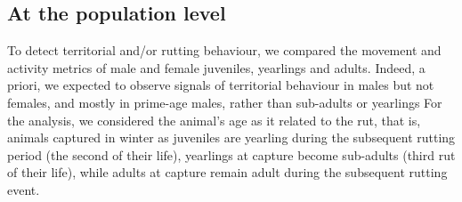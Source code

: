 \documentclass[a4paper,11pt]{article}
\begin{document}
\subsection*{At the population level}
To detect territorial and/or rutting behaviour, we compared the
movement and activity metrics of male and female juveniles, yearlings
and adults. Indeed, a priori, we expected to observe signals of
territorial behaviour in males but not females, and mostly in
prime-age males, rather than sub-adults or yearlings For the analysis,
we considered the animal’s age as it related to the rut, that is,
animals captured in winter as juveniles are yearling during the
subsequent rutting period (the second of their life), yearlings at
capture become sub-adults (third rut of their life), while adults at
capture remain adult during the subsequent rutting event.
\end{document}
